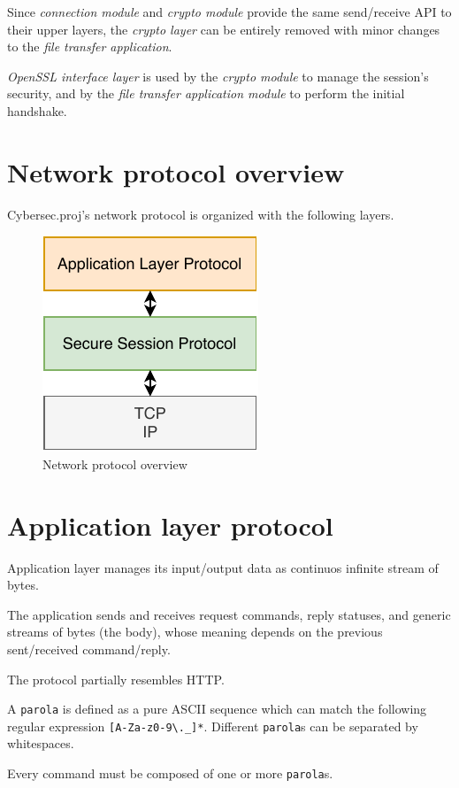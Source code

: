 \documentclass[a4paper,12pt]{article}
\newcommand{\projectname}{Cybersec.proj}
\begin{document}
Since \emph{connection module} and \emph{crypto module} provide the same send/receive API to their upper layers, the \emph{crypto layer} can be entirely removed with minor changes to the \emph{file transfer application}.

\emph{OpenSSL interface layer} is used by the \emph{crypto module} to manage the session's security, and by the \emph{file transfer application module} to perform the initial handshake.

\section{Network protocol overview}
\projectname{}'s network protocol is organized with the following layers.

\begin{figure}[H]
  \centering
  \includegraphics{img/protocol.pdf}
  \caption{Network protocol overview}
  \label{img:protocol}
\end{figure}

\section{Application layer protocol}
Application layer manages its input/output data as continuos infinite stream of bytes.

The application sends and receives request commands, reply statuses, and generic streams of bytes (the body), whose meaning depends on the previous sent/received command/reply.

The protocol partially resembles HTTP.

A \texttt{parola} is defined as a pure ASCII sequence which can match the following regular expression \texttt{[A-Za-z0-9\textbackslash.\_]*}.
Different \texttt{parola}s can be separated by whitespaces.

Every command must be composed of one or more \texttt{parola}s.
\end{document}
